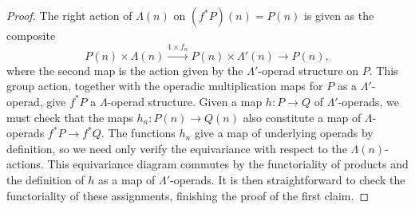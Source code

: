 \begin{proof}
The right action of $\Lambda(n)$ on $(f^{*}P)(n) = P(n)$ is given as the composite
\[
P(n) \times \Lambda(n) \stackrel{1 \times f_n}{\to} P(n) \times \Lambda'(n) \to P(n),
\]
where the second map is the action given by the $\Lambda'$-operad structure on $P$.
This group action, together with the operadic multiplication maps for $P$ as a $\Lambda'$-operad, give $f^*P$ a $\Lambda$-operad structure.
Given a map $h \colon P \to Q$ of $\Lambda'$-operads, we must check that the maps $h_n \colon P(n) \to Q(n)$ also constitute a map of $\Lambda$-operads $f^*P \to f^*Q$.
The functions $h_n$ give a map of underlying operads by definition, so we need only verify the equivariance with respect to the $\Lambda(n)$-actions.
This equivariance diagram commutes by the functoriality of products and the definition of $h$ as a map of $\Lambda'$-operads.
It is then straightforward to check the functoriality of these assignments, finishing the proof of the first claim.


\end{proof}
